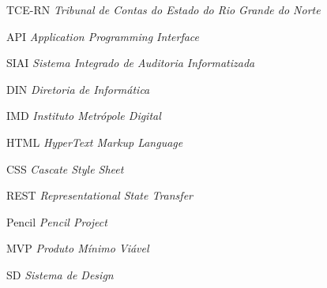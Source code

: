 \documentclass[
	12pt,				%
	oneside,
	a4paper,			%
	chapter=TITLE,
	sumario=tradicional,
	english,			%
	brazil,				%
	]{abntex2}
\begin{document}
\begin{siglas}
	\item[TCE-RN] \textit{Tribunal de Contas do Estado do Rio Grande do Norte}
	\item[API] \textit{Application Programming Interface}
	\item[SIAI] \textit{Sistema Integrado de Auditoria Informatizada}
	\item[DIN] \textit{Diretoria de Informática}
	\item[IMD] \textit{Instituto Metrópole Digital}
	\item[HTML] \textit{HyperText Markup Language}
	\item[CSS] \textit{Cascate Style Sheet}
	\item[REST] \textit{Representational State Transfer}
	\item[Pencil] \textit{Pencil Project}
	\item[MVP] \textit{ Produto Mínimo Viável}
	\item[SD] \textit{ Sistema de Design}
\end{siglas}


\tableofcontents*
\cleardoublepage

\textual













% 

% 


% 
\postextual



%

\end{document}
